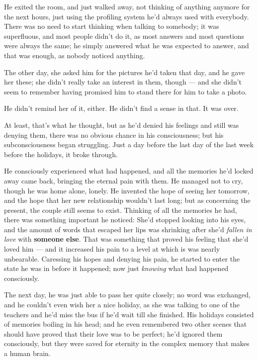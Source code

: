 He exited the room, and just walked away, not thinking of anything anymore for the next hours, just using the profiling system he'd always used with everybody. There was no need to start thinking when talking to somebody; it was superfluous, and most people didn't do it, as most answers and most questions were always the same; he simply answered what he was expected to answer, and that was enough, as nobody noticed anything.

The other day, she asked him for the pictures he'd taken that day, and he gave her these; she didn't really take an interest in them, though --- and she didn't seem to remember having promised him to stand there for him to take a photo.

He didn't remind her of it, either. He didn't find a sense in that. 
It was over.

At least, that's what he thought, but as he'd denied his feelings and still was denying them, there was no obvious chance in his consciousness; but his subconsciousness began struggling. 
Just a day before the last day of the last week before the holidays, it broke through.

He consciously experienced what had happened, and all the memories he'd locked away came back, bringing the eternal pain with them. He managed not to cry, though he was home alone, lonely. 
He invented the hope of seeing her tomorrow, and the hope that her new relationship wouldn't last long; but as concerning the present, the couple still seems to exist. 
Thinking of all the memories he had, there was something important he noticed: She'd stopped looking into his eyes, and the amount of words that escaped her lips was shrinking after she'd \emph{fallen in love} with \textbf{someone else}. That was something that proved his feeling that she'd loved him --- and it increased his pain to a level at which is was nearly unbearable. 
Caressing his hopes and denying his pain, he started to enter the state he was in before it happened; now just \emph{knowing} what had happened consciously.

The next day, he was just able to pass her quite closely; no word was exchanged, and he couldn't even wish her a nice holiday, as she was talking to one of the teachers and he'd miss the bus if he'd wait till she finished. 
His holidays consisted of memories boiling in his head; and he even remembered two other scenes that should have proved that their love was to be perfect; he'd ignored them consciously, but they were saved for eternity in the complex memory that makes a human brain.

